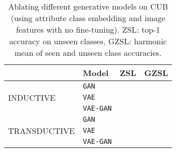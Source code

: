 \documentclass[10pt,twocolumn,letterpaper]{article}
\begin{document}
{
\setlength{\tabcolsep}{6pt}
\renewcommand{\arraystretch}{1.2} 
\begin{table}[t]
 \centering
   \begin{tabular}{l l c c}
    & \textbf{Model} & \textbf{ZSL} & \textbf{GZSL} \\ \hline
    \multirow{3}{*}{INDUCTIVE} & \texttt{GAN} &  &  \\
    & \texttt{VAE} &  &  \\
    & \texttt{VAE-GAN} &  &  \\
    \hline
    \multirow{3}{*}{TRANSDUCTIVE} & \texttt{GAN} &  &  \\
    & \texttt{VAE} &  &  \\
    & \texttt{VAE-GAN} &  & 
     \end{tabular}
\caption{Ablating different generative models on CUB (using attribute class embedding and image features with no fine-tuning). ZSL: top-1 accuracy on unseen classes, GZSL: harmonic mean of seen and unseen class accuracies. }
\label{tab:ablation}
\end{table}
}
\end{document}
